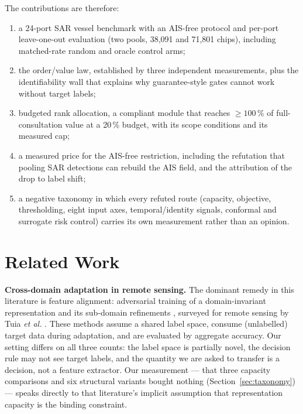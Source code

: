 \documentclass[journal]{IEEEtran}
\begin{document}
The contributions are therefore:
\begin{enumerate}
\item a 24-port SAR vessel benchmark with an AIS-free protocol and per-port leave-one-out evaluation
(two pools, 38{,}091 and 71{,}801 chips), including matched-rate random and oracle control arms;
\item the order/value law, established by three independent measurements, plus the identifiability wall
that explains why guarantee-style gates cannot work without target labels;
\item budgeted rank allocation, a compliant module that reaches $\ge 100$\,\% of full-consultation
value at a 20\,\% budget, with its scope conditions and its measured cap;
\item a measured price for the AIS-free restriction, including the refutation that pooling SAR
detections can rebuild the AIS field, and the attribution of the drop to label shift;
\item a negative taxonomy in which every refuted route (capacity, objective, thresholding, eight input
axes, temporal/identity signals, conformal and surrogate risk control) carries its own measurement
rather than an opinion.
\end{enumerate}

\section{Related Work}
\label{sec:rw}

\textbf{Cross-domain adaptation in remote sensing.} The dominant remedy in this literature is feature
alignment: adversarial training of a domain-invariant representation \cite{ganin2015dann,ganin2016dann}
and its sub-domain refinements \cite{zhu2021dsan}, surveyed for remote sensing by
Tuia \emph{et al.} \cite{tuia2016domain}. These methods assume a shared label space, consume
(unlabelled) target data during adaptation, and are evaluated by aggregate accuracy. Our setting
differs on all three counts: the label space is partially novel, the decision rule may not see target
labels, and the quantity we are asked to transfer is a decision, not a feature extractor. Our
measurement --- that three capacity comparisons and six structural variants bought nothing
(Section~\ref{sec:taxonomy}) --- speaks directly to that literature's implicit assumption that
representation capacity is the binding constraint.
\end{document}
